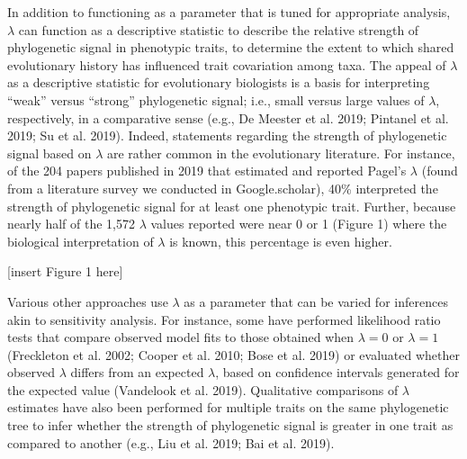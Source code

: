 \documentclass[]{article}
\begin{document}
In addition to functioning as a parameter that is tuned for appropriate
analysis, \(\lambda\) can function as a descriptive statistic to
describe the relative strength of phylogenetic signal in phenotypic
traits, to determine the extent to which shared evolutionary history has
influenced trait covariation among taxa. The appeal of \(\lambda\) as a
descriptive statistic for evolutionary biologists is a basis for
interpreting ``weak'' versus ``strong'' phylogenetic signal; i.e., small
versus large values of \(\lambda\), respectively, in a comparative sense
(e.g., De Meester et al. 2019; Pintanel et al. 2019; Su et al. 2019).
Indeed, statements regarding the strength of phylogenetic signal based
on \(\lambda\) are rather common in the evolutionary literature. For
instance, of the 204 papers published in 2019 that estimated and
reported Pagel's \(\lambda\) (found from a literature survey we
conducted in Google.scholar), 40\% interpreted the strength of
phylogenetic signal for at least one phenotypic trait. Further, because
nearly half of the 1,572 \(\lambda\) values reported were near 0 or 1
(Figure 1) where the biological interpretation of \(\lambda\) is known,
this percentage is even higher. \hfill\break

{[}insert Figure 1 here{]} \hfill\break

Various other approaches use \(\lambda\) as a parameter that can be
varied for inferences akin to sensitivity analysis. For instance, some
have performed likelihood ratio tests that compare observed model fits
to those obtained when \(\lambda=0\) or \(\lambda=1\) (Freckleton et al.
2002; Cooper et al. 2010; Bose et al. 2019) or evaluated whether
observed \(\lambda\) differs from an expected \(\lambda\), based on
confidence intervals generated for the expected value (Vandelook et al.
2019). Qualitative comparisons of \(\lambda\) estimates have also been
performed for multiple traits on the same phylogenetic tree to infer
whether the strength of phylogenetic signal is greater in one trait as
compared to another (e.g., Liu et al. 2019; Bai et al. 2019).
\hfill\break
\end{document}
